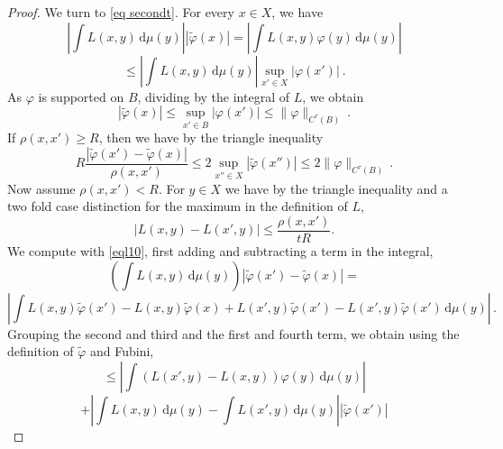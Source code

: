 {\begin{proof}
We turn to \eqref{eq secondt}. For every $x\in X$, we have
\begin{equation}
    \left|\int L(x,y) \, \mathrm{d}\mu(y)\right||\tilde{\varphi}(x)|
    =\left|\int L(x,y) {\varphi}(y)\, \mathrm{d}\mu(y)\right|
\end{equation}
 \begin{equation}
    \le \left|\int L(x,y) \, \mathrm{d}\mu(y)\right| \sup_{x'\in X}
    |{\varphi}(x')|\ .
\end{equation}
As $\varphi$ is supported on $B$, dividing by the integral of $L$, we obtain
\begin{equation}\label{eql42}
 |\tilde{\varphi}(x)|\le \sup_{x'\in B}
    |{\varphi}(x')|\le \|\varphi\|_{C^\tau(B)}\ .
\end{equation}
If $\rho(x,x')\ge R$, then we have by the triangle inequality
  \begin{equation}\label{eql52}
 R\frac{|\tilde{\varphi}(x') - \tilde \varphi(x)|}{\rho(x,x')} \le
 2\sup_{x''\in X} |\tilde{\varphi}(x'')|\le 2\|\varphi\|_{C^\tau(B)}\, .
\end{equation}
Now assume  $\rho(x,x')< R$. For $y\in X$ we have by the triangle inequality and a two fold case distinction
for the maximum in the definition of $L$,
\begin{equation}\label{eql10}
   |L(x,y) - L(x',y)| \le \frac{\rho(x,x')}{tR}.
\end{equation}
We compute with \eqref{eql10}, first adding and subtracting a term in the integral,
\begin{equation}
    \left(\int L(x,y) \, \mathrm{d}\mu(y)\right)
    |\tilde{\varphi}(x') - \tilde \varphi(x)|=
\end{equation}
\begin{equation}
    \left|\int L(x,y) \tilde{\varphi}(x')
    -L(x,y) \tilde{\varphi}(x)
    +L(x',y) \tilde{\varphi}(x')-
     L(x',y) \tilde{\varphi}(x')
    \, \mathrm{d}\mu(y)\right|\,.
\end{equation}
Grouping the second and third and the first and fourth term, we obtain using the definition of $\tilde \varphi$ and Fubini,
\begin{equation}\label{eql21}
    \le  \left| \int (L(x',y)-L(x,y)) \varphi(y) \, \mathrm{d}\mu(y)\right|
\end{equation}
\begin{equation}\label{eql22}
    +  \left| \int L(x,y)  \, \mathrm{d}\mu(y)-\int L(x',y)  \, \mathrm{d}\mu(y)\right||\tilde{\varphi}(x')|
\end{equation}
\begin{equation}\label{eql23}

\end{equation}
\end{proof}}
